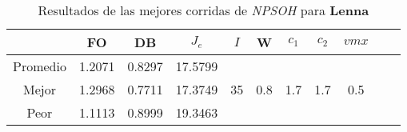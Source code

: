 \begin{table}[h!]
\footnotesize
\begin{center}
\begin{tabular}{|c|c|c|c|c|c|c|c|c|c|c|}
\hline
& {\bf FO} & {\bf DB}& $J_e$ & $I$ & W & $c_1$ & $c_2$ & $vmx$ \\
\hline
\hline
Promedio   & 1.2071 & 0.8297  & 17.5799 & &  &  &  & \\
\cline{1-4}
Mejor & 1.2968 & 0.7711  & 17.3749 & 35 & 0.8 & 1.7 & 1.7 & 0.5\\
\cline{1-4}
Peor & 1.1113 & 0.8999  & 19.3463 &  &  &  &  & \\\hline
\end{tabular}
\caption{Resultados de las mejores corridas de \emph{NPSOH} para {\bf Lenna}}
\label{tb:pmppsohibimg}
\end{center}
\end{table}
